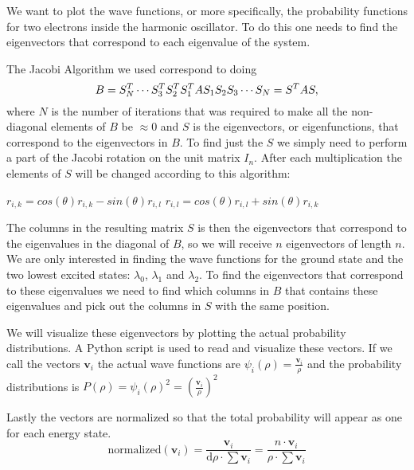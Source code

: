 

We want to plot the wave functions, or more specifically, the
probability functions for two electrons inside the harmonic
oscillator. To do this one needs to find the eigenvectors that
correspond to each eigenvalue of the system.

The Jacobi Algorithm we used correspond to doing
$$ B = S^T_N \cdots S^T_3 \\ S^T_2 \\ S^T_1 \\ A \\ S_1 \\ S_2 \\
S_3 \cdots S_N = S^T A S, $$
where $N$ is the number of iterations that was required to make all
the non-diagonal elements of $B$ be $\approx 0$ and $S$ is the
eigenvectors, or eigenfunctions, that correspond to the
eigenvectors in $B$. To find just the $S$ we simply need to perform
a part of the Jacobi rotation on the unit matrix $I_n$. After each
multiplication the elements of $S$ will be changed according to
this algorithm:
\begin{algorithmic}
        \State$r_{i,k} = cos(\theta)  r_{i,k} - sin(\theta)  r_{i,l}$
		\State$r_{i,l} = cos(\theta)  r_{i,l} + sin(\theta)  r_{i,k}$
    \EndFor
\end{algorithmic}
The columns in the resulting matrix $S$ is then the eigenvectors
that correspond to the eigenvalues in the diagonal of $B$, so we
will receive $n$ eigenvectors of length $n$. We are only interested
in finding the wave functions for the ground state and the two
lowest excited states: $\lambda_0$, $\lambda_1$ and $\lambda_2$. To
find the eigenvectors that correspond to these eigenvalues we need
to find which columns in $B$ that contains these eigenvalues and
pick out the columns in $S$ with the same position.

We will visualize these eigenvectors by plotting the actual
probability distributions. A Python script is used to read and
visualize these vectors. If we call the vectors $\mathbf{v}_i$ the
actual wave functions are $\psi_i(\rho) =
\frac{\mathbf{v}_i}{\rho}$ and the probability distributions is
$P(\rho) = \psi_i(\rho)^2 = ( \frac{\mathbf{v}_i}{\rho} )^2$

Lastly the vectors are normalized so that the total probability
will appear as one for each energy state.
$$
\mathrm{normalized}(\mathbf{v}_i)
= \frac{\mathbf{v}_i}{\mathrm{d}\rho \cdot \sum \mathbf{v}_i }
= \frac{n \cdot \mathbf{v}_i}{\rho \cdot \sum \mathbf{v}_i }
$$
